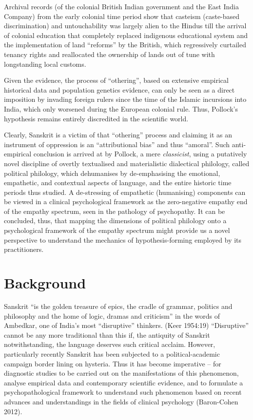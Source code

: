 Archival records (of the colonial British Indian government and the East India Company) from the early colonial time period show that casteism (caste-based discrimination) and untouchability was largely alien to the Hindus till the arrival of colonial education that completely replaced indigenous educational system and the implementation of land “reforms” by the British, which regressively curtailed tenancy rights and reallocated the ownership of lands out of tune with longstanding local customs.

Given the evidence, the process of “othering”, based on extensive empirical historical data and population genetics evidence, can only be seen as a direct imposition by invading foreign rulers since the time of the Islamic incursions into India, which only worsened during the European colonial rule. Thus, Pollock’s hypothesis remains entirely discredited in the scientific world.

Clearly, Sanskrit is a victim of that “othering” process and claiming it as an instrument of oppression is an “attributional bias” and thus “amoral”. Such anti-empirical conclusion is arrived at by Pollock, a mere \textit{classicist}, using a putatively novel discipline of overtly textualised and materialistic dialectical philology, called political philology, which dehumanises by de-emphasising the emotional, empathetic, and contextual aspects of language, and the entire historic time periods thus studied. A de-stressing of empathetic (humanising) components can be viewed in a clinical psychological framework as the zero-negative empathy end of the empathy spectrum, seen in the pathology of psychopathy. It can be concluded, thus, that mapping the dimensions of political philology onto a psychological framework of the empathy spectrum might provide us a novel perspective to understand the mechanics of hypothesis-forming employed by its practitioners.

\vspace{-.3cm}

\section*{Background}

Sanskrit “is the golden treasure of epics, the cradle of grammar, politics and philosophy and the home of logic, dramas and criticism” in the words of Ambedkar, one of India’s most “disruptive” thinkers. (Keer 1954:19) “Disruptive” cannot be any more traditional than this if, the antiquity of Sanskrit notwithstanding, the language deserves such critical acclaim. However, particularly recently Sanskrit has been subjected to a political-academic campaign border lining on hysteria. Thus it has become imperative – for diagnostic studies to be carried out on the manifestations of this phenomenon, analyse empirical data and contemporary scientific evidence, and to formulate a psychopathological framework to understand such phenomenon based on recent advances and understandings in the fields of clinical psychology (Baron-Cohen 2012).

